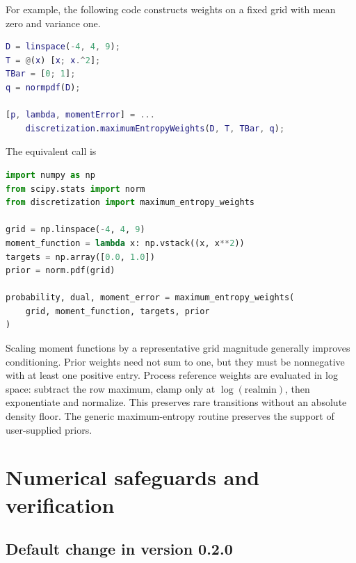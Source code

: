 For example, the following code constructs weights on a fixed grid with mean
zero and variance one.

\begin{lstlisting}[language=Matlab]
D = linspace(-4, 4, 9);
T = @(x) [x; x.^2];
TBar = [0; 1];
q = normpdf(D);

[p, lambda, momentError] = ...
    discretization.maximumEntropyWeights(D, T, TBar, q);
\end{lstlisting}

The equivalent \python{} call is

\begin{lstlisting}[language=Python]
import numpy as np
from scipy.stats import norm
from discretization import maximum_entropy_weights

grid = np.linspace(-4, 4, 9)
moment_function = lambda x: np.vstack((x, x**2))
targets = np.array([0.0, 1.0])
prior = norm.pdf(grid)

probability, dual, moment_error = maximum_entropy_weights(
    grid, moment_function, targets, prior
)
\end{lstlisting}

Scaling moment functions by a representative grid magnitude generally improves
conditioning. Prior weights need not sum to one, but they must be nonnegative
with at least one positive entry. Process reference weights are evaluated in
log space: subtract the row maximum, clamp only at $\log(\mathrm{realmin})$,
then exponentiate and normalize. This preserves rare transitions without an
absolute density floor. The generic maximum-entropy routine preserves the
support of user-supplied priors.

\section{Numerical safeguards and verification}

\subsection{Default change in version 0.2.0}

